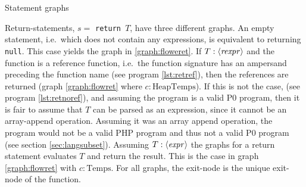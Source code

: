 \begin{graph}
{\begin{adjustbox}{max size={.25\textwidth}{.25\textheight}}
\end{adjustbox}}\hfill%
\hspace*{\fill}
\caption{Statement graphs}
\end{graph}

Return-statements, $s =$ \texttt{return $T$}, have three different graphs. An empty statement, i.e.\ which does not contain any expressions, is equivalent to returning \texttt{null}. This case yields the graph in \ref{graph:floweret}. If $T : \langle\mathit{rexpr}\rangle$ and the function is a reference function, i.e.\ the function signature has an ampersand preceding the function name (see program \ref{lst:retref}), then the references are returned (graph \ref{graph:flowret} where $c : \text{HeapTemps}$). If this is not the case, (see program \ref{lst:retnoref}), and assuming the program is a valid P0 program, then it is fair to assume that $T$ can be parsed as an expression, since it cannot be an array-append operation. Assuming it was an array append operation, the program would not be a valid PHP program and thus not a valid P0 program (see section \ref{sec:langsubset}). Assuming $T : \langle\mathit{expr}\rangle$ the graphs for a return statement evaluates $T$ and return the result. This is the case in graph \ref{graph:flowret} with $c : \text{Temps}$.  For all graphs, the exit-node is the unique exit-node of the function.

